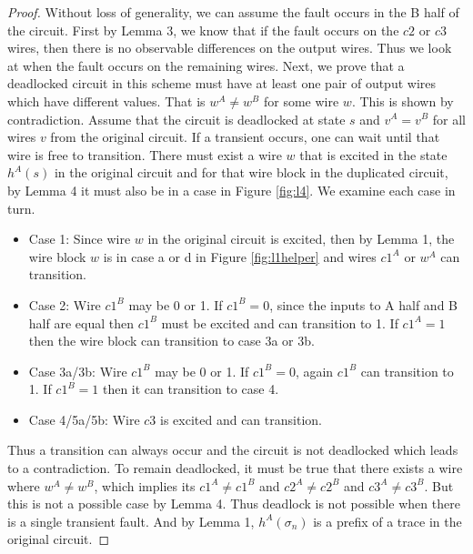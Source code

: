 \documentclass[12pt]{report}
\begin{document}
\begin{proof}
Without loss of generality, we can assume the fault occurs in the B half of the circuit.  First by Lemma 3, we know that if the fault occurs on the $c2$ or $c3$ wires, then there is no observable differences on the output wires.  Thus we look at when the fault occurs on the remaining wires. 
Next, we prove that a deadlocked circuit in this scheme must have at least one pair of output wires which have different values.  That is $w^A\neq w^B$ for some wire $w$.
This is shown by contradiction.  Assume that the circuit is deadlocked at state $s$ and $v^A = v^B$ for all wires $v$ from the original circuit.  If a transient occurs, one can wait until that wire is free to transition.  There
 must exist a wire $w$ that is excited in the state $h^A(s)$ in the original circuit and for that wire block in the duplicated circuit, by Lemma 4 it must also be in a case in Figure \ref{fig:l4}.  We examine each case in turn.
\begin{itemize}
	\item
	Case 1: Since wire $w$ in the original circuit is excited, then by Lemma 1, the wire block $w$ is in case a or d in Figure \ref{fig:l1helper} and wires $c1^A$ or $w^A$ can transition.
\item
Case 2:  Wire $c1^B$ may be 0 or 1.  If $c1^B=0$, since the inputs to A half and B half are equal then $c1^B$ must be excited and can transition to 1.  If $c1^A=1$ then the wire block can transition to case 3a or 3b.
\item
Case 3a/3b:  Wire $c1^B$ may be 0 or 1.  If $c1^B=0$, again $c1^B$ can transition to 1.  If $c1^B=1$ then it can transition to case 4.
\item
Case 4/5a/5b:  Wire $c3$ is excited and can transition. 
\end{itemize}
Thus a transition can always occur and the circuit is not deadlocked which leads to a contradiction.  To remain deadlocked, it must be true that there exists a wire where $w^A\neq w^B$, which implies its $c1^A\neq c1^B$ and $c2^A\neq c2^B$ and $c3^A\neq c3^B$.  But this is not a possible case by Lemma 4. Thus deadlock is not possible when there is a single transient fault.  And by Lemma 1, $h^A(\sigma_n)$ is a prefix of a trace in the original circuit. 
\end{proof}



%


\end{document}
